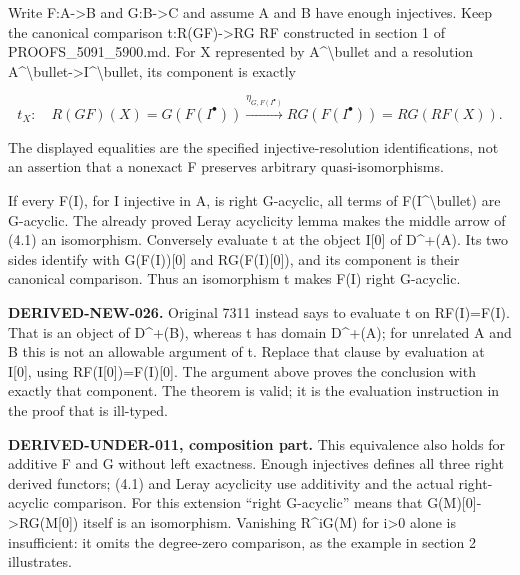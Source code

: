 Write F:\allowbreak{}A\allowbreak{}->B and G:\allowbreak{}B\allowbreak{}->C and assume A and B have enough injectives. Keep the canonical comparison t:\allowbreak{}R(GF)\allowbreak{}\allowbreak{}->RG RF constructed in section 1 of PROOFS\_\allowbreak{}5091\_\allowbreak{}5900.md. For X represented by A\^{}\textbackslash bullet and a resolution A\textasciicircum{}\textbackslash{}bullet\allowbreak{}->I\textasciicircum{}\textbackslash{}bullet,\allowbreak{} its component is exactly

\[
 t_X:\quad
 R(GF)(X)=G(F(I^\bullet))
       \xrightarrow{\eta_{G,F(I^\bullet)}}RG(F(I^\bullet))
       =RG(RF(X)).                                            \tag{4.1}
\]

The displayed equalities are the specified injective-resolution identifications,\allowbreak{} not an assertion that a nonexact F preserves arbitrary quasi-isomorphisms.

If every F(I)\allowbreak{},\allowbreak{} for I injective in A,\allowbreak{} is right G-acyclic,\allowbreak{} all terms of F(I\textasciicircum{}\textbackslash{}bullet)\allowbreak{} are G-acyclic. The already proved Leray acyclicity lemma makes the middle arrow of (4.1)\allowbreak{} an isomorphism. Conversely evaluate t at the object I[0]\allowbreak{} of D\textasciicircum{}\allowbreak{}+(A)\allowbreak{}. Its two sides identify with G(F(I)\allowbreak{})\allowbreak{}[0]\allowbreak{} and RG(F(I)\allowbreak{}[0]\allowbreak{})\allowbreak{},\allowbreak{} and its component is their canonical comparison. Thus an isomorphism t makes F(I)\allowbreak{} right G-acyclic.

\textbf{DERIVED-NEW-026.} Original 7311 instead says to evaluate t on RF(I)\allowbreak{}\allowbreak{}=F(I)\allowbreak{}. That is an object of D\textasciicircum{}\allowbreak{}+(B)\allowbreak{},\allowbreak{} whereas t has domain D\textasciicircum{}\allowbreak{}+(A)\allowbreak{}; for unrelated A and B this is not an allowable argument of t. Replace that clause by evaluation at I[0]\allowbreak{},\allowbreak{} using RF(I[0]\allowbreak{})\allowbreak{}\allowbreak{}=F(I)\allowbreak{}[0]\allowbreak{}. The argument above proves the conclusion with exactly that component. The theorem is valid; it is the evaluation instruction in the proof that is ill-typed.

\textbf{DERIVED-UNDER-011,\allowbreak{} composition part.} This equivalence also holds for additive F and G without left exactness. Enough injectives defines all three right derived functors; (4.1)\allowbreak{} and Leray acyclicity use additivity and the actual right-acyclic comparison. For this extension ``right G-acyclic'' means that G(M)\allowbreak{}[0]\allowbreak{}\allowbreak{}->RG(M[0]\allowbreak{})\allowbreak{} itself is an isomorphism. Vanishing R\textasciicircum{}iG(M)\allowbreak{} for i\textgreater0 alone is insufficient:\allowbreak{} it omits the degree-zero comparison,\allowbreak{} as the example in section 2 illustrates.

